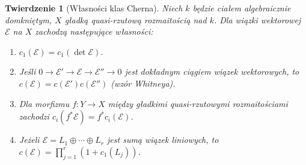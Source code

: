 \documentclass[11pt,a4paper,openany]{report}
\numberwithin{equation}{section}
\theoremstyle{plain}
\newtheorem{twierdzenie}{Twierdzenie}[section]
\theoremstyle{definition}
\theoremstyle{remark}
\begin{document}
\begin{twierdzenie}[Własności klas Cherna]
\label{tw:ga7-chern-axioms}
Niech $k$ będzie ciałem algebraicznie domkniętym,
$X$ gładką quasi-rzutową rozmaitością nad $k$.
Dla wiązki wektorowej $\mathcal E$ na $X$
zachodzą następujące własności:
\begin{enumerate}[label=(\roman*)]
\item $c_1(\mathcal E)=c_1(\det\mathcal E)$.
\item Jeśli $0\to\mathcal E'\to\mathcal E\to\mathcal E''\to0$
      jest dokładnym ciągiem wiązek wektorowych, to
      $c(\mathcal E)=c(\mathcal E')c(\mathcal E'')$
      (\emph{wzór Whitneya}).
\item Dla morfizmu $f:Y\to X$ między gładkimi
      quasi-rzutowymi rozmaitościami zachodzi
      $c_i(f^*\mathcal E)=f^*c_i(\mathcal E)$.
\item Jeżeli $\mathcal E=L_1\oplus\cdots\oplus L_r$
      jest sumą wiązek liniowych, to
      $c(\mathcal E)=\prod_{j=1}^r(1+c_1(L_j))$.
\end{enumerate}
\end{twierdzenie}
\end{document}
